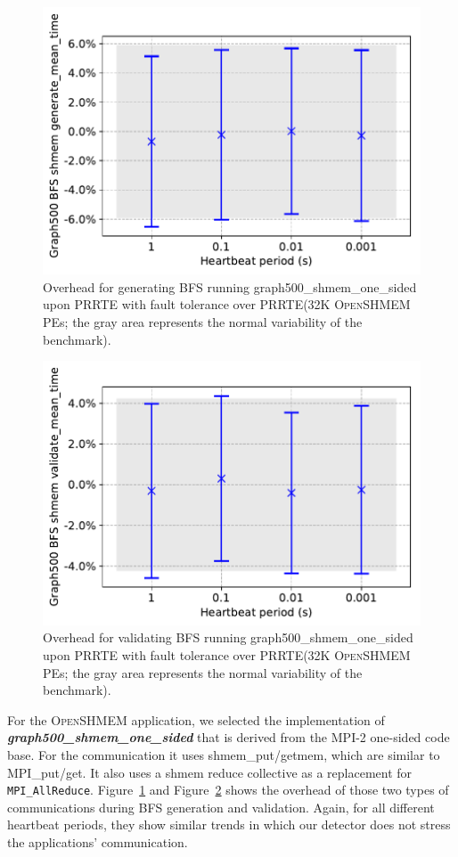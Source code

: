 \documentclass[5p,times,twocolumn]{elsarticle}
\newcommand{\mpifunc}[1]{\lstinline"MPI_#1"\xspace}
\newcommand{\prrte}[0]{\textsc{PRRTE}\xspace}
\newcommand{\mpi}[0]{\textsc{MPI}\xspace}
\newcommand{\oshmem}[0]{\textsc{OpenSHMEM}\xspace}
\begin{document}
\begin{figure}[h]
  \centering
  \includegraphics[width=\linewidth]{shmem_bfs_mean.pdf}
  \caption{Overhead for generating BFS running graph500\_shmem\_one\_sided upon \prrte with fault tolerance over \prrte (32K \oshmem PEs; the gray area represents the normal variability of the benchmark).}
  \label{fig:shmem.mean.bfs}
\end{figure}

\begin{figure}[h]
  \centering
  \includegraphics[width=\linewidth]{shmem_validate_bfs.pdf}
  \caption{Overhead for validating BFS running graph500\_shmem\_one\_sided upon \prrte with fault tolerance over \prrte (32K \oshmem PEs; the gray area represents the normal variability of the benchmark).}
  \label{fig:shmem.validate.bfs}
\end{figure}
For the \oshmem application, we selected the implementation of \textbf{\emph{graph500\_shmem\_one\_sided}} that
is derived from the \mpi-2 one-sided code base.
For the communication it uses shmem\_put/getmem, which are similar to MPI\_put/get. It also uses a shmem reduce collective as a replacement for \mpifunc{AllReduce}.
Figure~\ref{fig:shmem.mean.bfs} and Figure~\ref{fig:shmem.validate.bfs} shows the overhead of
those two types of communications during BFS generation and validation.
Again, for all different heartbeat periods, they show similar trends in which our detector does not stress the applications' communication.
\end{document}
